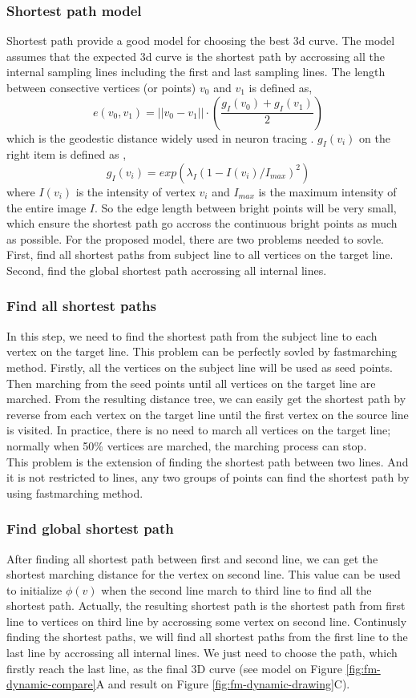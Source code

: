 \subsubsection{Shortest path model}
Shortest path provide a good model for choosing the best 3d curve. The model assumes that the expected 3d curve is the shortest path by accrossing all the internal sampling lines including the first and last sampling lines. The length between consective vertices (or points) $v_0$ and $v_1$ is defined as, 
$$
e(v_0,v_1) = ||v_0 - v_1||\cdot \left( \frac{g_I(v_0) + g_I(v_1)}{2} \right)
$$
which is the geodestic distance widely used in neuron tracing \cite{peng2010automatic, peng2011automatic}. $g_I(v_i)$ on the right item is defined as ,
$$
g_I(v_i) = exp(\lambda_I(1-I(v_i)/I_{max})^2)
$$
where $I(v_i)$ is the intensity of vertex $v_i$ and $I_{max}$ is the maximum intensity of the entire image $I$. So the edge length between bright points will be very small, which ensure the shortest path go accross the continuous bright points as much as possible.
For the proposed model, there are two problems needed to sovle. First, find all shortest paths from subject line to all vertices on the target line. Second, find the global shortest path accrossing all internal lines.
\subsubsection{Find all shortest paths}
In this step, we need to find the shortest path from the subject line to each vertex on the target line. This problem can be perfectly sovled by fastmarching method. Firstly, all the vertices on the subject line will be used as seed points. Then marching from the seed points until all vertices on the target line are marched. From the resulting distance tree, we can easily get the shortest path by reverse from each vertex on the target line until the first vertex on the source line is visited. In practice, there is no need to march all vertices on the target line; normally when 50\% vertices are marched, the marching process can stop.\\
This problem is the extension of finding the shortest path between two lines. And it is not restricted to lines, any two groups of points can find the shortest path by using fastmarching method.
\subsubsection{Find global shortest path}
After finding all shortest path between first and second line, we can get the shortest marching distance for the vertex on second line. This value can be used to initialize $\phi(v)$ when the second line march to third line to find all the shortest path. Actually, the resulting shortest path is the shortest path from first line to vertices on third line by accrossing some vertex on second line. Continusly finding the shortest paths, we will find all shortest paths from the first line to the last line by accrossing all internal lines. We just need to choose the path, which firstly reach the last line, as the final 3D curve (see model on Figure \ref{fig:fm-dynamic-compare}A and result on Figure \ref{fig:fm-dynamic-drawing}C).
